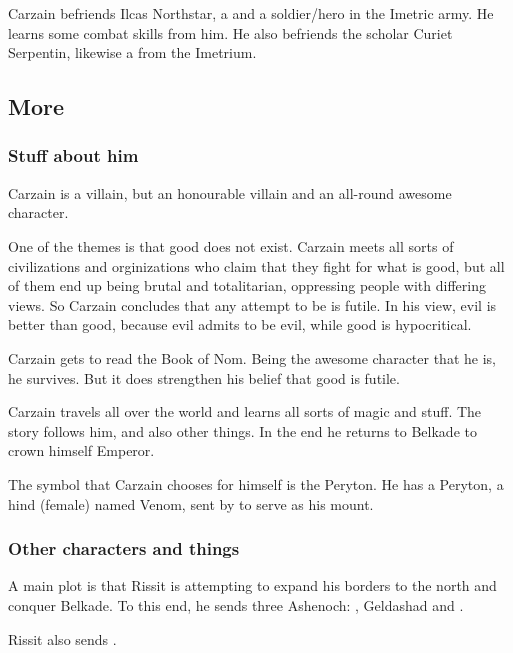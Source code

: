 Carzain befriends Ilcas Northstar, a \scathaese{} \nycaneer{} and a soldier/hero in the Imetric army. He learns some combat skills from him. He also befriends the scholar Curiet Serpentin, likewise a \scatha{} from the Imetrium. 


\subsection{More}

\subsubsection{Stuff about him}
Carzain is a villain, but an honourable villain and an all-round awesome character. 

One of the themes is that good does not exist. Carzain meets all sorts of civilizations and orginizations who claim that they fight for what is good, but all of them end up being brutal and totalitarian, oppressing people with differing views. So Carzain concludes that any attempt to be  is futile. In his view, evil is better than good, because evil admits to be evil, while good is hypocritical. 

Carzain gets to read the Book of Nom. Being the awesome character that he is, he survives. But it does strengthen his belief that good is futile. 

Carzain travels all over the world and learns all sorts of magic and stuff. The story follows him, and also other things. In the end he returns to Belkade to crown himself Emperor. 

The symbol that Carzain chooses for himself is the Peryton. He has a Peryton, a hind (female) named Venom, sent by \Belzir{} to serve as his mount. 



\subsubsection{Other characters and things}
A main plot is that Rissit is attempting to expand his borders to the north and conquer Belkade. To this end, he sends three Ashenoch: \Narkiza{}, Geldashad and \Dzerezdin{}. 

Rissit also sends \banes. 

